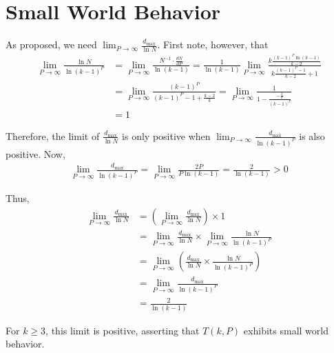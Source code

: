 \section{Small World Behavior}

    As proposed, we need $\lim_{P \to \infty} \frac{d_{\max}}{\ln N}$. First note, however, that
    \begin{align*}
        \lim_{P \to \infty} \frac{\ln N}{\ln (k-1)^P}
        &= \lim_{P \to \infty} \frac{N^{-1} \cdot \frac{d N}{dP}}{\ln(k-1)}
        = \frac{1}{\ln(k-1)} \lim_{P \to \infty} \frac{k \frac{(k-1)^P \ln(k-1)}{k-2}}{k \frac{(k-1)^P - 1}{k - 2} + 1} \\
        &= \lim_{P \to \infty} \frac{(k-1)^P}{(k-1)^P - 1 + \frac{k-2}{k}}
        = \lim_{P \to \infty} \frac{1}{1 - \frac{-\frac{2}{k}}{(k-1)^P}} \\
        &= 1
    \end{align*}

    Therefore, the limit of $\frac{d_{\max}}{\ln N}$ is only positive when $\lim_{P \to \infty} \frac{d_{\max}}{\ln(k-1)^P}$ is also positive. Now,
    \begin{align*}
        \lim_{P \to \infty} \frac{d_{\max}}{\ln(k-1)^P} =  \lim_{P \to \infty} \frac{2 P}{P \ln(k-1)} = \frac{2}{\ln(k-1)} > 0
    \end{align*}

    Thus,
    \begin{align*}
        \lim_{P \to \infty} \frac{d_{\max}}{\ln N}
        &= \left(\lim_{P \to \infty} \frac{d_{\max}}{\ln N}\right) \times 1 \\
        &= \lim_{P \to \infty} \frac{d_{\max}}{\ln N} \times \lim_{P \to \infty} \frac{\ln N}{\ln (k-1)^P} \\
        &= \lim_{P \to \infty} \left(\frac{d_{\max}}{\ln N} \times \frac{\ln N}{\ln (k-1)^P}\right) \\
        &= \lim_{P \to \infty} \frac{d_{\max}}{\ln(k-1)^P} \\
        &= \frac{2}{\ln(k-1)}
    \end{align*}

    For $k \geq 3$, this limit is positive, asserting that $T(k,P)$ exhibits small world behavior.
